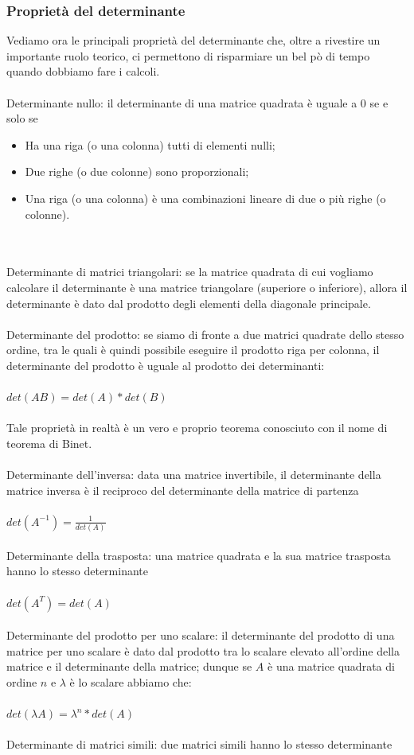\documentclass{report}
\begin{document}
\subsubsection{Proprietà del determinante}
Vediamo ora le principali proprietà del determinante che, oltre a rivestire un importante ruolo teorico, ci permettono di risparmiare un bel pò di tempo quando dobbiamo fare i calcoli.
\\
\\
Determinante nullo: il determinante di una matrice quadrata è uguale a 0 se e solo se
\begin{itemize}
  \item Ha una riga (o una colonna) tutti di elementi nulli;
  \item Due righe (o due colonne) sono proporzionali;
  \item Una riga (o una colonna) è una combinazioni lineare di due o più righe (o colonne).
\end{itemize}
\\
\\
Determinante di matrici triangolari: se la matrice quadrata di cui vogliamo calcolare il determinante è una matrice triangolare (superiore o inferiore), allora il determinante è dato dal prodotto degli elementi della diagonale principale.
\\
\\
Determinante del prodotto: se siamo di fronte a due matrici quadrate dello stesso ordine, tra le quali è quindi possibile eseguire il prodotto riga per colonna, il determinante del prodotto è uguale al prodotto dei determinanti:
\\
\\
$det(AB) = det(A)*det(B)$
\\
\\
Tale proprietà in realtà è un vero e proprio teorema conosciuto con il nome di teorema di Binet.
\\
\\
Determinante dell'inversa: data una matrice invertibile, il determinante della matrice inversa è il reciproco del determinante della matrice di partenza
\\
\\
$det(A^{-1}) = \frac{1}{det(A)}$
\\
\\
Determinante della trasposta: una matrice quadrata e la sua matrice trasposta hanno lo stesso determinante
\\
\\
$ det(A^{T}) = det(A)$
\\
\\
Determinante del prodotto per uno scalare: il determinante del prodotto di una matrice per uno scalare è dato dal prodotto tra lo scalare elevato all'ordine della matrice e il determinante della matrice; dunque se $A$ è una matrice quadrata di ordine $n$ e $\lambda$ è lo scalare abbiamo che:
\\
\\
$det(\lambda A) = \lambda^n * det(A)$
\\
\\
Determinante di matrici simili: due matrici simili hanno lo stesso determinante
\end{document}
